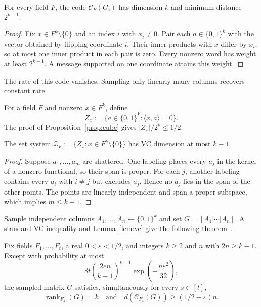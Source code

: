 \documentclass[runningheads,envcountsame,envcountsect]{llncs}
\newcommand{\rank}{\operatorname{rank}}
\newcommand{\cC}{\mathcal C}
\newcommand{\cZ}{\mathcal Z}
\begin{document}
\begin{proposition}\label{prop:cube}
For every field $F$, the code $\cC_F(G_{\square})$ has dimension $k$ and
minimum distance $2^{k-1}$.
\end{proposition}

\begin{proof}
Fix $x\in F^k\setminus\{0\}$ and an index $i$ with $x_i\ne0$.  Pair each
$a\in\{0,1\}^k$ with the vector obtained by flipping coordinate $i$.  Their
inner products with $x$ differ by $x_i$, so at most one inner product in each
pair is zero.  Every nonzero word has weight at least $2^{k-1}$.  A message
supported on one coordinate attains this weight.
\end{proof}

The rate of this code vanishes.  Sampling only linearly many columns recovers
constant rate.

For a field $F$ and nonzero $x\in F^k$, define
\[
  Z_x:=\{a\in\{0,1\}^k:\langle x,a\rangle=0\}.
\]
The proof of Proposition~\ref{prop:cube} gives $|Z_x|/2^k\le1/2$.

\begin{lemma}\label{lem:vc}
The set system $\cZ_F:=\{Z_x:x\in F^k\setminus\{0\}\}$ has VC dimension at
most $k-1$.
\end{lemma}

\begin{proof}
Suppose $a_1,\ldots,a_m$ are shattered.  One labeling places every $a_j$ in
the kernel of a nonzero functional, so their span is proper.  For each $j$,
another labeling contains every $a_i$ with $i\ne j$ but excludes $a_j$.
Hence no $a_j$ lies in the span of the other points.  The points are linearly
independent and span a proper subspace, which implies $m\le k-1$.
\end{proof}

Sample independent columns $A_1,\ldots,A_n\gets\{0,1\}^k$ and set
$G=[A_1|\cdots|A_n]$.  A standard VC inequality and
Lemma~\ref{lem:vc} give the following theorem~\cite{vc71}.

\begin{theorem}\label{thm:dense}
Fix fields $F_1,\ldots,F_t$, a real $0<\varepsilon<1/2$, and integers
$k\ge2$ and $n$ with $2n\ge k-1$.  Except with probability at most
\[
  8t\left(\frac{2en}{k-1}\right)^{k-1}
      \exp\left(-\frac{n\varepsilon^2}{32}\right),
\]
the sampled matrix $G$ satisfies, simultaneously for every $s\in[t]$,
\[
  \rank_{F_s}(G)=k
  \quad\text{and}\quad
  d(\cC_{F_s}(G))\ge(1/2-\varepsilon)n.
\]
\end{theorem}
\end{document}
